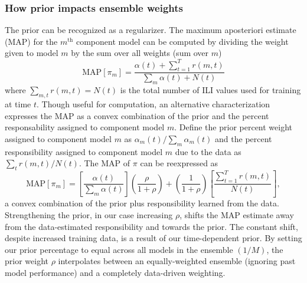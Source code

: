 \documentclass[sagev,times,Review,10pt]{sagej}
\def\l{\left}
\def\r{\right}
\newcommand{\f}{\frac}
\begin{document}
\subsubsection{How prior impacts ensemble weights}
The prior can be recognized as a regularizer.
The maximum aposteriori estimate (MAP) for the $m^{\text{th}}$ component model can be computed by dividing the weight given to model $m$ by the sum over all weights (sum over $m$)
\begin{equation}
  \text{MAP}\l[\pi_m\r] = \f{ \alpha(t) + \sum_{t=1}^{T}r(m,t)}{ \sum_{m}\alpha(t) + N(t) } \label{mapest}
\end{equation}
where $\sum_{m,t}r(m,t)=N(t)$ is the total number of ILI values used for training at time $t$.
Though useful for computation, an alternative characterization expresses the MAP as a convex combination of the prior and the percent responsability assigned to component model $m$.
Define the prior percent weight assigned to component model $m$ as $\alpha_{m}(t)/\sum_{m}\alpha_{m}(t)$ and the percent responsibility assigned to component model $m$ due to the data as $\sum_{t}r(m,t)/N(t)$.
The MAP of $\pi$ can be reexpressed as 
\begin{equation}
  \text{MAP}\l[\pi_m\r] = \l[ \f{\alpha(t)}{\sum_{m} \alpha(t)}\r]\l(\f{\rho}{1+\rho}\r) + \l(\f{1}{1+\rho}\r) \l[\f{\sum_{t=1}^{T}r(m,t)}{N(t)}\r],
\end{equation}
a convex combination of the prior plus responsibility learned from the data.
Strengthening the prior, in our case increasing $\rho$, shifts the MAP estimate away from the data-estimated responsibility and towards the prior.
The constant shift, despite increased training data, is a result of our time-dependent prior.
By setting our prior percentage to equal across all models in the ensemble $(1/M)$, the prior weight $\rho$ interpolates between an equally-weighted ensemble (ignoring past model performance) and a completely data-driven weighting.
\end{document}
